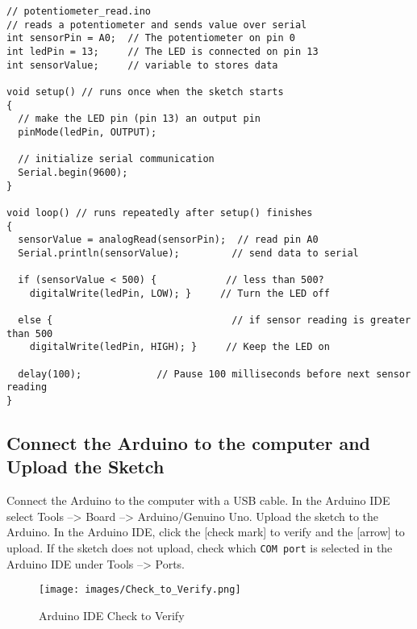 \documentclass{book}
\makeatletter
\def\maxwidth{\ifdim\Gin@nat@width>\linewidth\linewidth
\else\Gin@nat@width\fi}
\let\Oldincludegraphics\includegraphics
\renewcommand{\includegraphics}[1]{\Oldincludegraphics[width=.8\maxwidth]{#1}}
\newcommand{\passthrough}[1]{#1}
\makeatother
\begin{document}
    
        \begin{lstlisting}
// potentiometer_read.ino
// reads a potentiometer and sends value over serial
int sensorPin = A0;  // The potentiometer on pin 0                  
int ledPin = 13;     // The LED is connected on pin 13
int sensorValue;     // variable to stores data

void setup() // runs once when the sketch starts
{
  // make the LED pin (pin 13) an output pin
  pinMode(ledPin, OUTPUT);

  // initialize serial communication
  Serial.begin(9600);
}

void loop() // runs repeatedly after setup() finishes
{
  sensorValue = analogRead(sensorPin);  // read pin A0   
  Serial.println(sensorValue);         // send data to serial
  
  if (sensorValue < 500) {            // less than 500?
    digitalWrite(ledPin, LOW); }     // Turn the LED off
  
  else {                               // if sensor reading is greater than 500
    digitalWrite(ledPin, HIGH); }     // Keep the LED on
  
  delay(100);             // Pause 100 milliseconds before next sensor reading
}
\end{lstlisting}
    




    
        \hypertarget{connect-the-arduino-to-the-computer-and-upload-the-sketch}{%
\subsection{Connect the Arduino to the computer and Upload the
Sketch}\label{connect-the-arduino-to-the-computer-and-upload-the-sketch}}
    




    
        Connect the Arduino to the computer with a USB cable. In the Arduino IDE
select Tools --\textgreater{} Board --\textgreater{} Arduino/Genuino
Uno. Upload the sketch to the Arduino. In the Arduino IDE, click the
{[}check mark{]} to verify and the {[}arrow{]} to upload. If the sketch
does not upload, check which \passthrough{\lstinline!COM port!} is
selected in the Arduino IDE under Tools --\textgreater{} Ports.

\begin{figure}
\centering
\texttt{[image: images/Check\_to\_Verify.png]}
\caption{Arduino IDE Check to Verify}
\end{figure}
\end{document}
